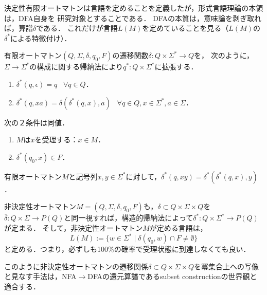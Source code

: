 \begin{tcolorbox}[colframe=ForestGreen, colback=ForestGreen!10!white, breakable]
    決定性有限オートマトンは言語を定めることを定義したが，形式言語理論の本領は，DFA自身を
    研究対象とすることである．
    DFAの本質は，意味論を剥ぎ取れば，算譜$\delta$である．
    これだけが言語$L(M)$を定めていることを見る（$L(M)$の$\delta^*$による特徴付け）．
\end{tcolorbox}

\begin{definition}
    有限オートマトン$(Q,\Sigma,\delta,q_0,F)$の遷移関数$\delta:Q\times\Sigma^*\to Q$を，
    次のように，$\Sigma\to\Sigma^*$の構成に関する帰納法により$q^*:Q\times\Sigma^*$に拡張する．
    \begin{enumerate}
        \item $\delta^*(q,\epsilon)=q\;\;\;\forall q\in Q$．
        \item $\delta^*(q,xa)=\delta(\delta^*(q,x),a)\;\;\;\forall q\in Q,x\in\Sigma^*,a\in\Sigma$．
    \end{enumerate}
\end{definition}

\begin{proposition}[$M$が$x$を受理することの特徴付け]
    次の２条件は同値．
    \begin{enumerate}
        \item $M$は$x$を受理する：$x\in M$．
        \item $\delta^*(q_0,x)\in F$．
    \end{enumerate}
\end{proposition}

\begin{proposition}
    有限オートマトン$M$と記号列$x,y\in\Sigma^*$に対して，$\delta^*(q,xy)=\delta^*(\delta^*(q,x),y)$．
\end{proposition}

\begin{remark}
    非決定性オートマトン$M=(Q,\Sigma,\delta,q_0,F)$も，$\delta\subset Q\times\Sigma\times Q$を$\overline{\delta}:Q\times\Sigma\to P(Q)$と同一視すれば，構造的帰納法によって$\delta^*:Q\times\Sigma^*\to P(Q)$が定まる．
    そして，非決定性オートマトン$M$が定める言語は，
    \[L(M):=\{w\in\Sigma^*\mid \delta(q_0,w)\cap F\ne\emptyset\}\]
    と定める．つまり，必ずしも100\%の確率で受理状態に到達しなくても良い．

    このように非決定性オートマトンの遷移関係$\delta\subset Q\times\Sigma\times Q$を冪集合上への写像と見なす手法は，NFA$\to$DFAの還元算譜であるsubset constructionの世界観と適合する．
\end{remark}

